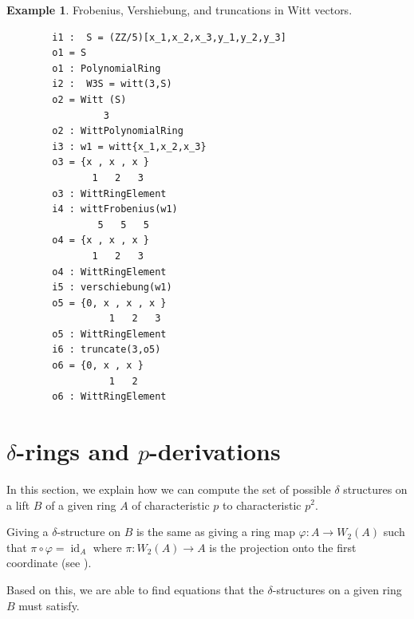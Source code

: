 \documentclass{article}
\theoremstyle{plain}
\theoremstyle{definition}
\newtheorem{example}[theorem]{Example}
\DeclareMathOperator{\id}{id}
\renewcommand{\phi}{\varphi}
\renewcommand{\to}{\longrightarrow}
\begin{document}
\begin{example} Frobenius, Vershiebung, and truncations in Witt vectors.
    \begin{verbatim}
        i1 :  S = (ZZ/5)[x_1,x_2,x_3,y_1,y_2,y_3]
        o1 = S
        o1 : PolynomialRing
        i2 :  W3S = witt(3,S)
        o2 = Witt (S)
                 3
        o2 : WittPolynomialRing
        i3 : w1 = witt{x_1,x_2,x_3}
        o3 = {x , x , x }
               1   2   3
        o3 : WittRingElement
        i4 : wittFrobenius(w1)
                5   5   5
        o4 = {x , x , x }
               1   2   3
        o4 : WittRingElement
        i5 : verschiebung(w1)
        o5 = {0, x , x , x }
                  1   2   3
        o5 : WittRingElement
        i6 : truncate(3,o5)
        o6 = {0, x , x }
                  1   2
        o6 : WittRingElement
    \end{verbatim}
\end{example}

\section{$\delta$-rings and $p$-derivations}\label{section frobeniuslift}
In this section, we explain how we can compute the set of possible $\delta$ structures on a lift $B$ of a given ring $A$ of characteristic $p$ to characteristic $p^2$. 

Giving a $\delta$-structure on $B$ is the same as giving a ring map $\phi\colon A\to W_2(A)$ such that $\pi\circ \phi=\id_A$ where $\pi\colon W_2(A)\to A$ is the projection onto the first coordinate (see \cite[Section 1 - Corollaire]{JoyalDeltaAnneauWitt}).

Based on this, we are able to find equations that the $\delta$-structures on a given ring $B$ must satisfy.
\end{document}
